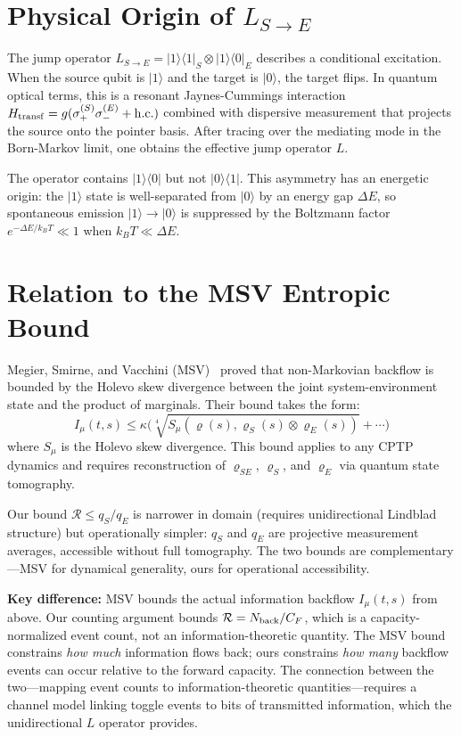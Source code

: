 \documentclass[aps,prl,onecolumn]{revtex4-2}
\begin{document}
\section{Physical Origin of $L_{S\to E}$}

The jump operator $L_{S\to E}=|1\rangle\langle 1|_S\otimes|1\rangle\langle 0|_E$ describes a conditional excitation. When the source qubit is $|1\rangle$ and the target is $|0\rangle$, the target flips. In quantum optical terms, this is a resonant Jaynes-Cummings interaction $H_{\rm transf} = g(\sigma_+^{(S)}\sigma_-^{(E)} + {\rm h.c.})$ combined with dispersive measurement that projects the source onto the pointer basis. After tracing over the mediating mode in the Born-Markov limit, one obtains the effective jump operator $L$.

The operator contains $|1\rangle\langle 0|$ but not $|0\rangle\langle 1|$. This asymmetry has an energetic origin: the $|1\rangle$ state is well-separated from $|0\rangle$ by an energy gap $\Delta E$, so spontaneous emission $|1\rangle \to |0\rangle$ is suppressed by the Boltzmann factor $e^{-\Delta E/k_B T} \ll 1$ when $k_B T \ll \Delta E$.

\section{Relation to the MSV Entropic Bound}

Megier, Smirne, and Vacchini (MSV)~\cite{Megier:2021} proved that non-Markovian backflow is bounded by the Holevo skew divergence between the joint system-environment state and the product of marginals. Their bound takes the form:
\begin{equation}
I_\mu(t,s) \leq \kappa\Big(\sqrt[4]{S_\mu(\varrho(s), \varrho_S(s) \otimes \varrho_E(s))} + \cdots\Big)
\end{equation}
where $S_\mu$ is the Holevo skew divergence. This bound applies to any CPTP dynamics and requires reconstruction of $\varrho_{SE}$, $\varrho_S$, and $\varrho_E$ via quantum state tomography.

Our bound $\mathcal{R} \leq q_S/q_E$ is narrower in domain (requires unidirectional Lindblad structure) but operationally simpler: $q_S$ and $q_E$ are projective measurement averages, accessible without full tomography. The two bounds are complementary---MSV for dynamical generality, ours for operational accessibility.

\textbf{Key difference:} MSV bounds the actual information backflow $I_\mu(t,s)$ from above. Our counting argument bounds $\mathcal{R} = N_{\rm back}/C_F$, which is a capacity-normalized event count, not an information-theoretic quantity. The MSV bound constrains \textit{how much} information flows back; ours constrains \textit{how many} backflow events can occur relative to the forward capacity. The connection between the two---mapping event counts to information-theoretic quantities---requires a channel model linking toggle events to bits of transmitted information, which the unidirectional $L$ operator provides.
\end{document}
